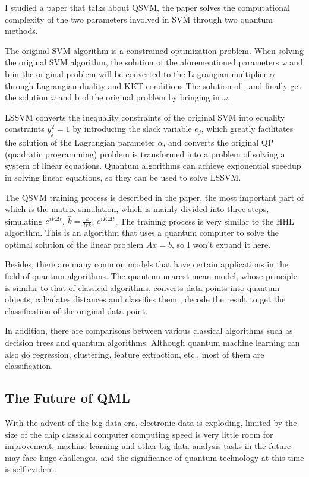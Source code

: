 \documentclass[11pt]{article}
\begin{document}
I studied a paper that talks about QSVM, the paper solves the computational complexity of the two parameters involved in SVM through two quantum methods.

The original SVM algorithm is a constrained optimization problem. When solving the original SVM algorithm, the solution of the aforementioned parameters $\omega$ and b in the original problem will be converted to the Lagrangian multiplier $\alpha$ through Lagrangian duality and KKT conditions The solution of , and finally get the solution $\omega$ and b of the original problem by bringing in $\omega$.

LSSVM converts the inequality constraints of the original SVM into equality constraints $y_j^2=1$ by introducing the slack variable $e_j$, which greatly facilitates the solution of the Lagrangian parameter $\alpha$, and converts the original QP (quadratic programming) problem is transformed into a problem of solving a system of linear equations. Quantum algorithms can achieve exponential speedup in solving linear equations, so they can be used to solve LSSVM.

The QSVM training process is described in the paper, the most important part of which is the matrix simulation, which is mainly divided into three steps, simulating $e^{i\hat{F}\Delta t}$, $\hat{k} =\frac{k}{trk}$, $e^{i\hat{K}\Delta t}$. The training process is very similar to the HHL algorithm. This is an algorithm that uses a quantum computer to solve the optimal solution of the linear problem $Ax=b$, so I won’t expand it here.

Besides, there are many common models that have certain applications in the field of quantum algorithms. The quantum nearest mean model, whose principle is similar to that of classical algorithms, converts data points into quantum objects, calculates distances and classifies them , decode the result to get the classification of the original data point.

In addition, there are comparisons between various classical algorithms such as decision trees and quantum algorithms. Although quantum machine learning can also do regression, clustering, feature extraction, etc., most of them are classification.

\subsection{The Future of QML}
\qquad With the advent of the big data era, electronic data is exploding, limited by the size of the chip classical computer computing speed is very little room for improvement, machine learning and other big data analysis tasks in the future may face huge challenges, and the significance of quantum technology at this time is self-evident.
\end{document}
